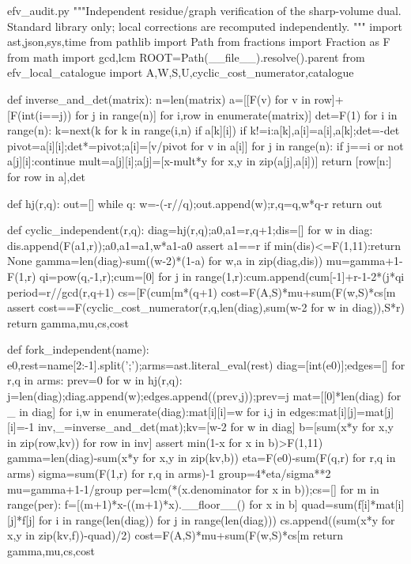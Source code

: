 \documentclass[12pt,a4paper]{article}
\numberwithin{equation}{section}
\theoremstyle{definition}
\begin{document}
\begin{filecontents*}[overwrite]{efv_audit.py}
"""Independent residue/graph verification of the sharp-volume dual.
Standard library only; local corrections are recomputed independently.
"""
import ast,json,sys,time
from pathlib import Path
from fractions import Fraction as F
from math import gcd,lcm
ROOT=Path(__file__).resolve().parent
from efv_local_catalogue import A,W,S,U,cyclic_cost_numerator,catalogue

def inverse_and_det(matrix):
    n=len(matrix)
    a=[[F(v) for v in row]+[F(int(i==j)) for j in range(n)] for i,row in enumerate(matrix)]
    det=F(1)
    for i in range(n):
        k=next(k for k in range(i,n) if a[k][i])
        if k!=i:a[k],a[i]=a[i],a[k];det=-det
        pivot=a[i][i];det*=pivot;a[i]=[v/pivot for v in a[i]]
        for j in range(n):
            if j==i or not a[j][i]:continue
            mult=a[j][i];a[j]=[x-mult*y for x,y in zip(a[j],a[i])]
    return [row[n:] for row in a],det

def hj(r,q):
    out=[]
    while q:
        w=-(-r//q);out.append(w);r,q=q,w*q-r
    return out

def cyclic_independent(r,q):
    diag=hj(r,q);a0,a1=r,q+1;dis=[]
    for w in diag:
        dis.append(F(a1,r));a0,a1=a1,w*a1-a0
    assert a1==r
    if min(dis)<=F(1,11):return None
    gamma=len(diag)-sum((w-2)*(1-a) for w,a in zip(diag,dis))
    mu=gamma+1-F(1,r)
    qi=pow(q,-1,r);cum=[0]
    for j in range(1,r):cum.append(cum[-1]+r-1-2*(j*qi%
    period=r//gcd(r,q+1)
    cs=[F(cum[m*(q+1)%
    cost=F(A,S)*mu+sum(F(w,S)*cs[m%
    assert cost==F(cyclic_cost_numerator(r,q,len(diag),sum(w-2 for w in diag)),S*r)
    return gamma,mu,cs,cost

def fork_independent(name):
    e0,rest=name[2:-1].split(';');arms=ast.literal_eval(rest)
    diag=[int(e0)];edges=[]
    for r,q in arms:
        prev=0
        for w in hj(r,q):
            j=len(diag);diag.append(w);edges.append((prev,j));prev=j
    mat=[[0]*len(diag) for _ in diag]
    for i,w in enumerate(diag):mat[i][i]=w
    for i,j in edges:mat[i][j]=mat[j][i]=-1
    inv,_=inverse_and_det(mat);kv=[w-2 for w in diag]
    b=[sum(x*y for x,y in zip(row,kv)) for row in inv]
    assert min(1-x for x in b)>F(1,11)
    gamma=len(diag)-sum(x*y for x,y in zip(kv,b))
    eta=F(e0)-sum(F(q,r) for r,q in arms)
    sigma=sum(F(1,r) for r,q in arms)-1
    group=4*eta/sigma**2
    mu=gamma+1-1/group
    per=lcm(*(x.denominator for x in b));cs=[]
    for m in range(per):
        f=[(m+1)*x-((m+1)*x).__floor__() for x in b]
        quad=sum(f[i]*mat[i][j]*f[j] for i in range(len(diag)) for j in range(len(diag)))
        cs.append((sum(x*y for x,y in zip(kv,f))-quad)/2)
    cost=F(A,S)*mu+sum(F(w,S)*cs[m%
    return gamma,mu,cs,cost


\end{filecontents*}
\end{document}
